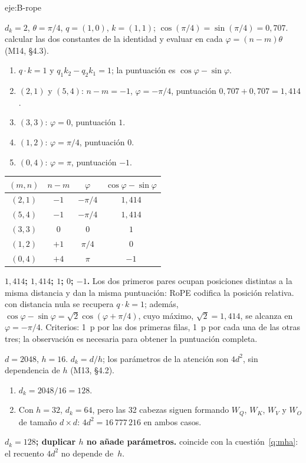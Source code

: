 \begin{solucion}{eje:B-rope}

\datos $d_k=2$, $\theta=\pi/4$, $q=(1,0)$, $k=(1,1)$; $\cos(\pi/4)=\sin(\pi/4)=0{,}707$.
\planteamiento calcular las dos constantes de la identidad y evaluar en cada $\varphi=(n-m)\theta$~\cite{roformer} (M14, §4.3).
\pasos
\begin{enumerate}[label=\arabic*.]
  \item $q\cdot k=1$ y $q_1k_2-q_2k_1=1$; la puntuación es $\cos\varphi-\sin\varphi$.
  \item $(2,1)$ y $(5,4)$: $n-m=-1$, $\varphi=-\pi/4$, puntuación $0{,}707+0{,}707=1{,}414$.
  \item $(3,3)$: $\varphi=0$, puntuación $1$.
  \item $(1,2)$: $\varphi=\pi/4$, puntuación $0$.
  \item $(0,4)$: $\varphi=\pi$, puntuación $-1$.
\end{enumerate}

\begin{center}\small
\begin{tabular}{@{}cccc@{}}
\toprule
$(m,n)$ & $n-m$ & $\varphi$ & $\cos\varphi-\sin\varphi$ \\
\midrule
$(2,1)$ & $-1$ & $-\pi/4$ & $1{,}414$ \\
$(5,4)$ & $-1$ & $-\pi/4$ & $1{,}414$ \\
$(3,3)$ & $0$ & $0$ & $1$ \\
$(1,2)$ & $+1$ & $\pi/4$ & $0$ \\
$(0,4)$ & $+4$ & $\pi$ & $-1$ \\
\bottomrule
\end{tabular}
\end{center}

\resultado \textbf{$1{,}414$; $1{,}414$; $1$; $0$; $-1$.} Los dos primeros pares ocupan posiciones distintas a la misma distancia y dan la misma puntuación: RoPE codifica la posición relativa.
\comprobacion con distancia nula se recupera $q\cdot k=1$; además, $\cos\varphi-\sin\varphi=\sqrt2\cos(\varphi+\pi/4)$, cuyo máximo, $\sqrt2=1{,}414$, se alcanza en $\varphi=-\pi/4$. Criterios: 1~p por las dos primeras filas, 1~p por cada una de las otras tres; la observación es necesaria para obtener la puntuación completa.

\datos $d=2048$, $h=16$.
\planteamiento $d_k=d/h$; los parámetros de la atención son $4d^{2}$, sin dependencia de $h$ (M13, §4.2).
\pasos
\begin{enumerate}[label=\arabic*.]
  \item $d_k=2048/16=128$.
  \item Con $h=32$, $d_k=64$, pero las 32 cabezas siguen formando $W_Q$, $W_K$, $W_V$ y $W_O$ de tamaño $d\times d$: $4d^{2}=16\,777\,216$ en ambos casos.
\end{enumerate}
\resultado \textbf{$d_k=128$; duplicar $h$ no añade parámetros.}
\comprobacion coincide con la cuestión~\ref{q:mha}: el recuento $4d^{2}$ no depende de~$h$.


\end{solucion}

